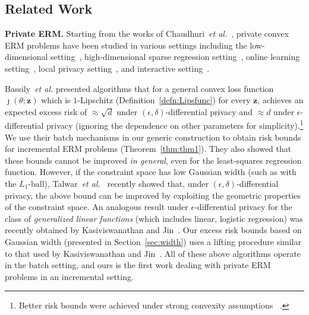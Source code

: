 \documentclass{article}
\theoremstyle{plain}
\def \eps {\epsilon}
\def \z {\mathbf z}
\begin{document}
\subsection{Related Work} \label{sec:related}
\noindent\textbf{Private ERM.} Starting from the works of Chaudhuri~\emph{et al.}\ \cite{chaudhuri2009privacy,chaudhuri2011differentially}, private convex ERM problems have been studied in various settings including the low-dimensional setting~\cite{rubinstein2009learning,kifer2012private}, high-dimensional sparse regression setting~\cite{kifer2012private,thakurta2013differentially}, online learning setting~\cite{DBLP:journals/jmlr/JainKT12,thakurta2013nearly,jain2014near,DBLP:conf/uai/MishraT15}, local privacy setting~\cite{duchi2013local}, and interactive setting~\cite{jain2013differentially,ullman2015private}.

Bassily~\emph{et al.} \cite{bassily2014differentially} presented algorithms that for a general convex loss function $\jmath(\theta;\z)$ which is $1$-Lipschitz (Definition~\ref{defn:Lipsfunc}) for every $\z$, achieves an expected excess risk of $\approx \sqrt{d}$ under $(\eps,\delta)$-differential privacy and $\approx d$ under $\eps$-differential privacy (ignoring the dependence on other parameters for simplicity).\!\footnote{Better risk bounds were achieved under strong convexity assumptions
~\cite{bassily2014differentially,talwar2014private}.} We use their batch mechanisms in our generic construction to obtain risk bounds for incremental ERM problems (Theorem~\ref{thm:thm1}). They also showed that these bounds cannot be improved {\em in general}, even for the least-squares regression function.
However, if the constraint space has low Gaussian width (such as with the $L_1$-ball), Talwar~\emph{et al.}\ \cite{talwar2014private,talwar2015nearly} recently showed that, under $(\eps,\delta)$-differential privacy, the above bound can be improved by exploiting the geometric properties of the constraint space. An analogous result under $\eps$-differential privacy for the class of {\em generalized linear functions} (which includes linear, logistic regression) was recently obtained by Kasiviswanathan and Jin~\cite{kasiviswanathanicml}. Our excess risk bounds based on Gaussian width (presented in Section~\ref{sec:width}) uses a lifting procedure similar to that used by Kasiviswanathan and Jin~\cite{kasiviswanathanicml}. All of these above algorithms operate in the batch setting, and ours is the first work dealing with private ERM problems in an incremental setting.
\end{document}
